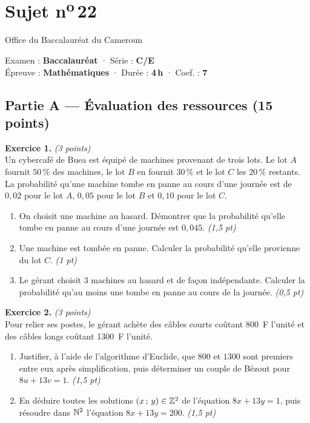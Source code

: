 \section{Sujet n\textsuperscript{o}\,22}
\noindent\begin{minipage}{0.5\linewidth}\footnotesize Office du Baccalauréat du Cameroun\end{minipage}%
\hfill\begin{minipage}{0.45\linewidth}\footnotesize\raggedleft Examen : \textbf{Baccalauréat} · Série : \textbf{C/E}\\
Épreuve : \textbf{Mathématiques} · Durée : \textbf{4\,h} · Coef. : \textbf{7}\end{minipage}
\par\smallskip{\color{onbo}\rule{\linewidth}{1pt}}

\subsection*{Partie A — Évaluation des ressources \hfill (15 points)}

\noindent\textbf{Exercice 1.} \hfill\textit{(3 points)}\\
Un cybercafé de Buea est équipé de machines provenant de trois lots. Le lot $A$ fournit
$50\,\%$ des machines, le lot $B$ en fournit $30\,\%$ et le lot $C$ les $20\,\%$ restants.
La probabilité qu'une machine tombe en panne au cours d'une journée est de $0{,}02$ pour
le lot $A$, $0{,}05$ pour le lot $B$ et $0{,}10$ pour le lot $C$.
\begin{enumerate}[label=\arabic*)]
\item On choisit une machine au hasard. Démontrer que la probabilité qu'elle tombe en
panne au cours d'une journée est $0{,}045$. \hfill\textit{(1,5 pt)}
\item Une machine est tombée en panne. Calculer la probabilité qu'elle provienne du
lot $C$. \hfill\textit{(1 pt)}
\item Le gérant choisit $3$ machines au hasard et de façon indépendante. Calculer la
probabilité qu'au moins une tombe en panne au cours de la journée. \hfill\textit{(0,5 pt)}
\end{enumerate}

\smallskip
\noindent\textbf{Exercice 2.} \hfill\textit{(3 points)}\\
Pour relier ses postes, le gérant achète des câbles courts coûtant \SI{800}{F} l'unité et
des câbles longs coûtant \SI{1300}{F} l'unité.
\begin{enumerate}[label=\arabic*)]
\item Justifier, à l'aide de l'algorithme d'Euclide, que $800$ et $1300$ sont premiers
entre eux après simplification, puis déterminer un couple de Bézout pour
$8u+13v=1$. \hfill\textit{(1,5 pt)}
\item En déduire toutes les solutions $(x\,;\,y)\in\mathbb{Z}^2$ de l'équation
$8x+13y=1$, puis résoudre dans $\mathbb{N}^2$ l'équation $8x+13y=200$. \hfill\textit{(1,5 pt)}
\end{enumerate}

